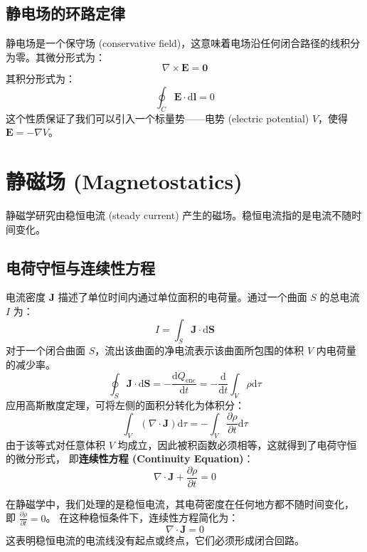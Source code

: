 \documentclass[fontset=none]{ctexart}
\begin{document}
\subsection{静电场的环路定律}
\begin{law}[静电场无旋性]
    静电场是一个保守场 (conservative field)，这意味着电场沿任何闭合路径的线积分为零。其微分形式为：
    \begin{equation}
        \nabla \times \bm{E} = \bm{0}
    \end{equation}
    其积分形式为：
    \begin{equation}
        \oint_C \bm{E} \cdot \mathrm{d}\bm{l} = 0
    \end{equation}
    这个性质保证了我们可以引入一个标量势——电势 (electric potential) $V$，使得 $\bm{E} = -\nabla V$。
\end{law}

\section{静磁场 (Magnetostatics)}
静磁学研究由稳恒电流 (steady current) 产生的磁场。稳恒电流指的是电流不随时间变化。

\subsection{电荷守恒与连续性方程}
电流密度 $\bm{J}$ 描述了单位时间内通过单位面积的电荷量。通过一个曲面 $S$ 的总电流 $I$ 为：
\begin{equation}
    I = \int_S \bm{J} \cdot \mathrm{d}\bm{S}
\end{equation}
对于一个闭合曲面 $S$，流出该曲面的净电流表示该曲面所包围的体积 $V$ 内电荷量的减少率。
\begin{equation}
    \oint_S \bm{J} \cdot \mathrm{d}\bm{S} 
    = -\frac{\mathrm{d}Q_{\text{enc}}}{\mathrm{d}t} 
    = -\frac{\mathrm{d}}{\mathrm{d}t} \int_V \rho \mathrm{d}\tau
\end{equation}
应用高斯散度定理，可将左侧的面积分转化为体积分：
\begin{equation}
    \int_V (\nabla \cdot \bm{J}) \mathrm{d}\tau 
    = -\int_V \frac{\partial\rho}{\partial t} \mathrm{d}\tau
\end{equation}
由于该等式对任意体积 $V$ 均成立，因此被积函数必须相等，这就得到了电荷守恒的微分形式，
即\textbf{连续性方程 (Continuity Equation)}：
\begin{equation}
    \nabla \cdot \bm{J} + \frac{\partial\rho}{\partial t} = 0
\end{equation}
\begin{definition}[稳恒电流]
    在静磁学中，我们处理的是稳恒电流，其电荷密度在任何地方都不随时间变化，
    即 $\frac{\partial\rho}{\partial t} = 0$。
    在这种稳恒条件下，连续性方程简化为：
    \begin{equation}
        \nabla \cdot \bm{J} = 0
    \end{equation}
    这表明稳恒电流的电流线没有起点或终点，它们必须形成闭合回路。
\end{definition}
\end{document}
